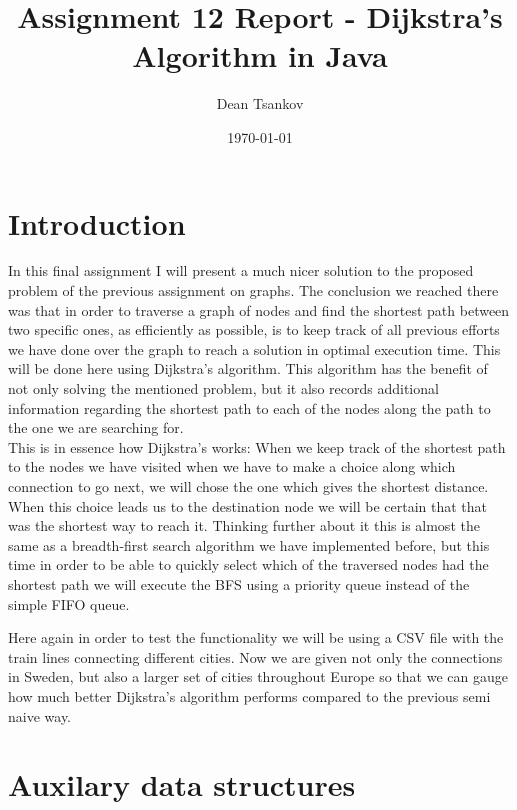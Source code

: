 \documentclass[a4paper,11pt]{article}
\begin{document}
\title{
    \textbf{Assignment 12 Report - Dijkstra's Algorithm in Java}
}
\author{Dean Tsankov}
\date{\today}

\maketitle

\section*{Introduction}

In this final assignment I will present a much nicer solution to the proposed problem of the previous assignment on graphs. The conclusion we reached there was that in order to traverse a graph of nodes and find the shortest path between two specific ones, as efficiently as possible, is to keep track of all previous efforts we have done over the graph to reach a solution in optimal execution time.
This will be done here using Dijkstra's algorithm. This algorithm has the benefit of not only solving the mentioned problem, but it also records additional information regarding the shortest path to each of the nodes along the path to the one we are searching for. 
\\

This is in essence how Dijkstra's works: When we keep track of the shortest path to the nodes we have visited when we have to make a choice along which connection to go next, we will chose the one which gives the shortest distance. When this choice leads us to the destination node we will be certain that that was the shortest way to reach it. Thinking further about it this is almost the same as a breadth-first search algorithm we have implemented before, but this time in order to be able to quickly select which of the traversed nodes had the shortest path we will execute the BFS using a priority queue instead of the simple FIFO queue.

Here again in order to test the functionality we will be using a CSV file with the train lines connecting different cities. Now we are given not only the connections in Sweden, but also a larger set of cities throughout Europe so that we can gauge how much better Dijkstra's algorithm performs compared to the previous semi naive way.

\section*{Auxilary data structures}
\end{document}
